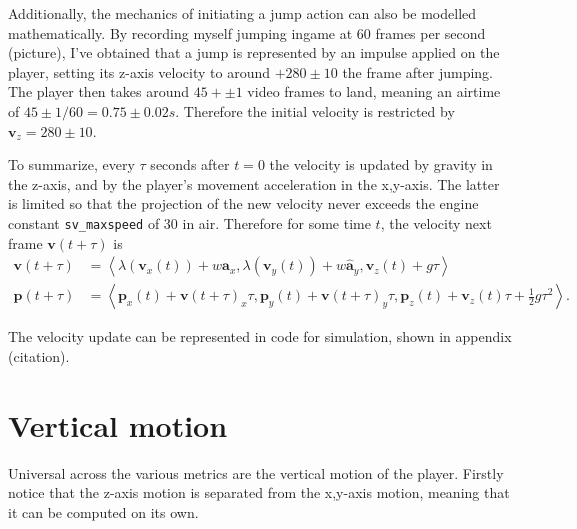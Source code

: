 \documentclass[a4paper,11pt]{article}
\newcommand{\tvec}[1]{\boldsymbol{#1}}
\newcommand{\tunit}[1]{\boldsymbol{\hat{#1}}}
\newcommand{\tang}[1]{\left\langle #1 \right\rangle}
\newcommand{\tv}{\tvec{v}}
\newcommand{\tp}{\tvec{p}}
\begin{document}
Additionally, the mechanics of initiating a jump action can also be modelled mathematically. By recording myself jumping ingame at 60 frames per second (picture), I've obtained that a jump is represented by an impulse applied on the player, setting its z-axis velocity to around $+280\pm10$ the frame after jumping. The player then takes around $45 + \pm1$ video frames to land, meaning an airtime of $45\pm1 / 60 =0.75\pm 0.02\si{s}$. Therefore the initial velocity is restricted by $\tv_z = 280\pm10$.

To summarize, every $\tau$ seconds after $t=0$ the velocity is updated by gravity in the z-axis, and by the player's movement acceleration in the x,y-axis. The latter is limited so that the projection of the new velocity never exceeds the engine constant \verb|sv_maxspeed| of 30 in air. Therefore for some time $t$, the velocity next frame $\tv(t+\tau)$ is
\begin{align*}
    \tv(t+\tau) &= \tang{\lambda(\tv_x(t)) + w \tunit{a}_x, \lambda(\tv_y(t)) + w\tunit{a}_y,\tv_z(t) + g\tau}\\
    \tp(t+\tau) &= \tang{\tp_x(t) + \tv(t+\tau)_x \tau, \tp_y(t) + \tv(t+\tau)_y \tau, \tp_z(t) + \tv_z(t)\tau + \frac{1}{2}g\tau^2}.
\end{align*}

The velocity update can be represented in code for simulation, shown in appendix (citation).

\section{Vertical motion}
Universal across the various metrics are the vertical motion of the player. Firstly notice that the z-axis motion is separated from the x,y-axis motion, meaning that it can be computed on its own.
\end{document}
